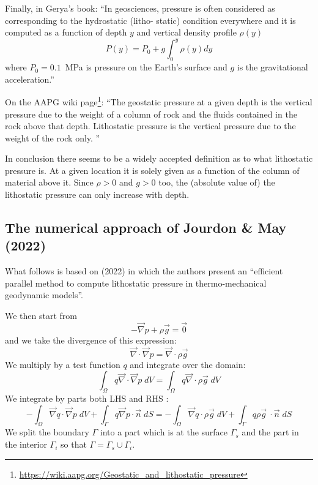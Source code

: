 Finally, in Gerya's book:
``In geosciences, pressure is often considered as corresponding to the hydrostatic (litho-
static) condition everywhere and it is computed as a function of depth $y$ and vertical density
profile $\rho(y)$
\[
P(y)=P_0 + g \int_0^y \rho(y) dy
\]
where $P_0=0.1$~MPa is pressure on the Earth’s surface and $g$ is the gravitational
acceleration.''

On the AAPG wiki page\footnote{\url{https://wiki.aapg.org/Geostatic_and_lithostatic_pressure}}:
``The geostatic pressure at a given depth is the vertical pressure due to the weight of a column of 
rock and the fluids contained in the rock above that depth. Lithostatic pressure is the vertical 
pressure due to the weight of the rock only. ''

In conclusion there seems to be a widely accepted definition as to what lithostatic pressure is.
At a given location it is solely given as a function of the column of material 
above it. Since $\rho>0$ and $g>0$ too, the (absolute value of) the lithostatic pressure
can only increase with depth.

\subsection*{The numerical approach of Jourdon \& May (2022)}

What follows is based on \textcite{joma22} (2022) in which the authors present an
``efficient parallel method to compute lithostatic pressure in thermo-mechanical geodynamic models''.

We then start from 
\begin{equation}
-\vec\nabla p + \rho \vec{g} = \vec{0}
\label{eq:gradpstrong}
\end{equation}
and we take the divergence of this expression:
\[
\vec\nabla \cdot \vec\nabla p = \vec\nabla \cdot \rho \vec{g} 
\]
We multiply by a test function $q$ and integrate over the domain:
\[
\int_\Omega q \vec\nabla \cdot \vec\nabla p \;dV
=
\int_\Omega q \vec\nabla \cdot \rho \vec{g} \;dV
\]
We integrate by parts both LHS and RHS :
\[
-\int_\Omega \vec\nabla q \cdot  \vec\nabla p \;dV + \int_\Gamma q \vec\nabla p \cdot \vec{n} \;dS
=
-\int_\Omega  \vec\nabla q \cdot  \rho \vec{g} \;dV + \int_\Gamma q \rho \vec{g} \    \cdot \vec{n} \;dS
\]
We split the boundary $\Gamma$ into a part which is at the surface $\Gamma_s$ and the part 
in the interior $\Gamma_i$ so that $\Gamma = \Gamma_s \cup \Gamma_i$.
    
